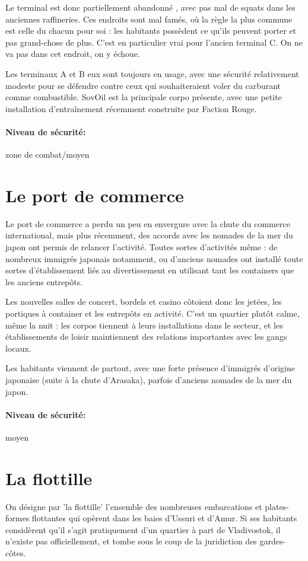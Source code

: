 \documentclass[10pt,a4paper]{book}
\begin{document}
Le terminal est donc partiellement abandonné , avec pas mal de squats dans les anciennes raffineries. Ces endroits sont mal famés, où la règle la plus commune est celle du chacun pour soi : les habitants possèdent ce qu'ils peuvent porter et pas grand-chose de plus. C'est en particulier vrai pour l'ancien terminal C. On ne va pas dans cet endroit, on y échoue.

Les terminaux A et B eux sont toujours en usage, avec une sécurité relativement modeste pour se défendre contre ceux qui souhaiteraient voler du carburant comme combustible. SovOil est la principale corpo présente, avec une petite installation d'entraînement récemment construite par Faction Rouge.
\paragraph{Niveau de sécurité:} zone de combat/moyen
\section{Le port de commerce}
Le port de commerce a perdu un peu en envergure avec la chute du commerce international, mais plus récemment, des accords avec les nomades de la mer du japon ont permis de relancer l'activité. Toutes sortes d'activités même : de nombreux immigrés japonais notamment, ou d'anciens nomades ont installé toute sortes d'établissement liés au divertissement en utilisant tant les containers que les anciens entrepôts. 

Les nouvelles salles de concert, bordels et casino côtoient donc les jetées, les portiques à container et les entrepôts en activité. C'est un quartier plutôt calme, même la nuit : les corpos tiennent à leurs installations dans le secteur, et les établissements de loisir maintiennent des relations importantes avec les gangs locaux.

Les habitants viennent de partout, avec une forte présence d'immigrés d'origine japonaise (suite à la chute d'Arasaka), parfois d'anciens nomades de la mer du japon.
\paragraph{Niveau de sécurité:}moyen
\section{La flottille}
On désigne par 'la flottille' l'ensemble des nombreuses embarcations et plates-formes flottantes qui opèrent dans les baies d'Ussuri et d'Amur. Si ses habitants considèrent qu'il s'agit pratiquement d'un quartier à part de Vladivostok, il n'existe pas officiellement, et tombe sous le coup de la juridiction des gardes-côtes.
\end{document}
